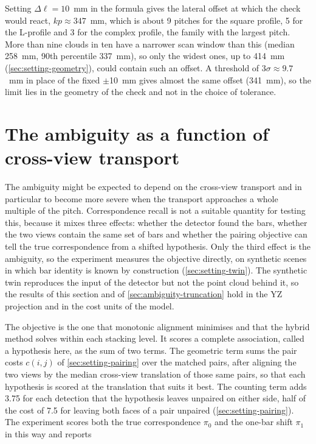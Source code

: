 \documentclass[a4paper, 12pt, twoside]{book}
\begin{document}
Setting $\Delta\ell = 10$~mm in the formula gives the lateral offset at which the check would react, $kp \approx 347$~mm, which is about 9 pitches for the square profile, 5 for the L-profile and 3 for the complex profile, the family with the largest pitch. More than nine clouds in ten have a narrower scan window than this (median 258~mm, 90th percentile 337~mm), so only the widest ones, up to 414~mm (\cref{sec:setting-geometry}), could contain such an offset. A threshold of $3\sigma \approx 9.7$~mm in place of the fixed $\pm$10~mm gives almost the same offset (341~mm), so the limit lies in the geometry of the check and not in the choice of tolerance.

\section{The ambiguity as a function of cross-view transport}
\label{sec:ambiguity-transport}

The ambiguity might be expected to depend on the cross-view transport and in particular to become more severe when the transport approaches a whole multiple of the pitch. Correspondence recall is not a suitable quantity for testing this, because it mixes three effects: whether the detector found the bars, whether the two views contain the same set of bars and whether the pairing objective can tell the true correspondence from a shifted hypothesis. Only the third effect is the ambiguity, so the experiment measures the objective directly, on synthetic scenes in which bar identity is known by construction (\cref{sec:setting-twin}). The synthetic twin reproduces the input of the detector but not the point cloud behind it, so the results of this section and of \cref{sec:ambiguity-truncation} hold in the YZ projection and in the cost units of the model.

The objective is the one that monotonic alignment minimises and that the hybrid method solves within each stacking level. It scores a complete association, called a hypothesis here, as the sum of two terms. The geometric term sums the pair costs $c(i, j)$ of \cref{sec:setting-pairing} over the matched pairs, after aligning the two views by the median cross-view translation of those same pairs, so that each hypothesis is scored at the translation that suits it best. The counting term adds 3.75 for each detection that the hypothesis leaves unpaired on either side, half of the cost of 7.5 for leaving both faces of a pair unpaired (\cref{sec:setting-pairing}). The experiment scores both the true correspondence $\pi_0$ and the one-bar shift $\pi_1$ in this way and reports
\end{document}
